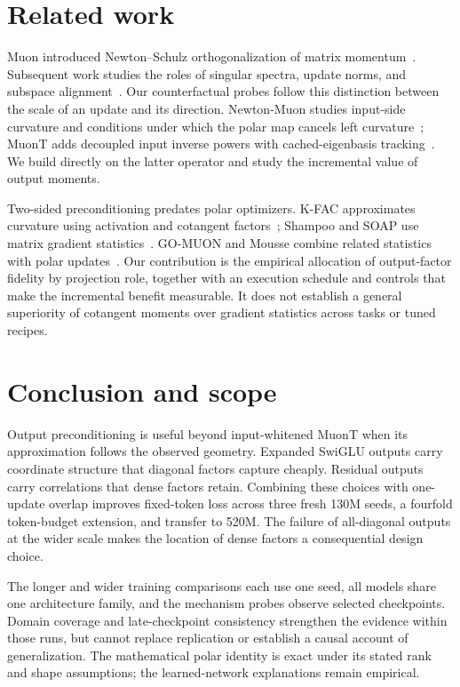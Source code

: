 \FloatBarrier
\section{Related work}
\label{sec:related}

Muon introduced Newton--Schulz orthogonalization of matrix momentum~\citep{jordan2024muon}. Subsequent work studies the roles of singular spectra, update norms, and subspace alignment~\citep{shumaylov2026freon,goyal2026spectrally}. Our counterfactual probes follow this distinction between the scale of an update and its direction. Newton-Muon studies input-side curvature and conditions under which the polar map cancels left curvature~\citep{du2026newtonmuon}; MuonT adds decoupled input inverse powers with cached-eigenbasis tracking~\citep{mohamadi2026toner}. We build directly on the latter operator and study the incremental value of output moments.

Two-sided preconditioning predates polar optimizers. K-FAC approximates curvature using activation and cotangent factors~\citep{martens2015kfac}; Shampoo and SOAP use matrix gradient statistics~\citep{gupta2018shampoo,anil2020scalable,vyas2024soap}. GO-MUON and Mousse combine related statistics with polar updates~\citep{che2026gomuon,zhang2026mousse}. Our contribution is the empirical allocation of output-factor fidelity by projection role, together with an execution schedule and controls that make the incremental benefit measurable. It does not establish a general superiority of cotangent moments over gradient statistics across tasks or tuned recipes.

\section{Conclusion and scope}
\label{sec:conclusion}

Output preconditioning is useful beyond input-whitened MuonT when its approximation follows the observed geometry. Expanded SwiGLU outputs carry coordinate structure that diagonal factors capture cheaply. Residual outputs carry correlations that dense factors retain. Combining these choices with one-update overlap improves fixed-token loss across three fresh 130M seeds, a fourfold token-budget extension, and transfer to 520M. The failure of all-diagonal outputs at the wider scale makes the location of dense factors a consequential design choice.

The longer and wider training comparisons each use one seed, all models share one architecture family, and the mechanism probes observe selected checkpoints. Domain coverage and late-checkpoint consistency strengthen the evidence within those runs, but cannot replace replication or establish a causal account of generalization. The mathematical polar identity is exact under its stated rank and shape assumptions; the learned-network explanations remain empirical.

